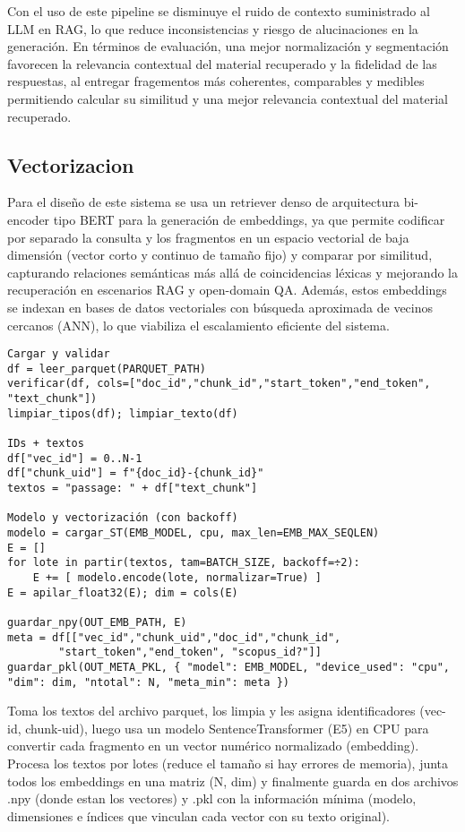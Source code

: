 Con el uso de este pipeline se disminuye el ruido de contexto suministrado al LLM en RAG, 
lo que reduce inconsistencias y riesgo de alucinaciones en la generación. En términos de evaluación, una mejor normalización y segmentación
 favorecen la relevancia contextual del material recuperado y la fidelidad de las respuestas, al entregar fragementos más coherentes, comparables y medibles permitiendo
 calcular su similitud y una mejor relevancia contextual del material recuperado.


\subsection{Vectorizacion}
Para el diseño de este sistema se usa un retriever denso de arquitectura bi-encoder tipo BERT para la generación de embeddings, ya que permite codificar por separado la 
consulta y los fragmentos en un espacio vectorial de baja dimensión (vector corto y continuo de tamaño fijo) y comparar por similitud, 
capturando relaciones semánticas más allá de coincidencias léxicas y mejorando la recuperación en escenarios RAG y open-domain QA.
Además, estos embeddings se indexan en bases de datos vectoriales con búsqueda aproximada de vecinos cercanos (ANN), lo que viabiliza el escalamiento eficiente del sistema\parencite{joshi2025vector}.
\begin{verbatim}
Cargar y validar
df = leer_parquet(PARQUET_PATH)
verificar(df, cols=["doc_id","chunk_id","start_token","end_token",
"text_chunk"])
limpiar_tipos(df); limpiar_texto(df)

IDs + textos
df["vec_id"] = 0..N-1
df["chunk_uid"] = f"{doc_id}-{chunk_id}"
textos = "passage: " + df["text_chunk"]

Modelo y vectorización (con backoff)
modelo = cargar_ST(EMB_MODEL, cpu, max_len=EMB_MAX_SEQLEN)
E = []
for lote in partir(textos, tam=BATCH_SIZE, backoff=÷2):
    E += [ modelo.encode(lote, normalizar=True) ]
E = apilar_float32(E); dim = cols(E)

guardar_npy(OUT_EMB_PATH, E)
meta = df[["vec_id","chunk_uid","doc_id","chunk_id",
        "start_token","end_token", "scopus_id?"]]
guardar_pkl(OUT_META_PKL, { "model": EMB_MODEL, "device_used": "cpu", "dim": dim, "ntotal": N, "meta_min": meta })
\end{verbatim}
Toma los textos del archivo parquet, los limpia y les asigna identificadores (vec-id, chunk-uid), luego usa un modelo SentenceTransformer (E5) en CPU para convertir cada fragmento en un vector numérico normalizado (embedding).
Procesa los textos por lotes (reduce el tamaño si hay errores de memoria), junta todos los embeddings en una matriz (N, dim) y finalmente guarda en dos archivos .npy (donde estan los vectores) y .pkl con la información mínima (modelo, dimensiones e índices que vinculan cada vector con su texto original).


